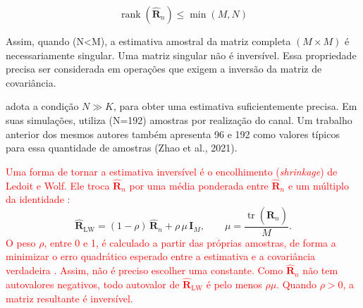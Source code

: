 \[
\operatorname{rank}(\widehat{\mathbf R}_n) \leq \min(M,N)
\]

Assim, quando (N<M), a estimativa amostral da matriz completa $(M\times M)$ é necessariamente singular. Uma matriz singular não é inversível. Essa propriedade precisa ser considerada em operações que exigem a inversão da matriz de covariância.

\cite{zhao2025jsac} adota a condição $N\gg K$, para obter uma estimativa suficientemente precisa. Em suas simulações, utiliza (N=192) amostras por realização do canal. Um trabalho anterior dos mesmos autores também apresenta 96 e 192 como valores típicos para essa quantidade de amostras (Zhao et al., 2021).

\textcolor{red}{Uma forma de tornar a estimativa inversível é o encolhimento (\textit{shrinkage}) de Ledoit e Wolf. Ele troca $\hat{\mathbf R}_n$ por uma média ponderada entre $\hat{\mathbf R}_n$ e um múltiplo da identidade \cite{ledoit-wolf}:}
\begin{equation}
\hat{\mathbf R}_{\text{LW}}=(1-\rho)\,\hat{\mathbf R}_n+\rho\,\mu\,\mathbf I_M,
\qquad
\mu=\frac{\operatorname{tr}(\hat{\mathbf R}_n)}{M}.
\label{eq:ledoit-wolf}
\end{equation}
\textcolor{red}{O peso $\rho$, entre 0 e 1, é calculado a partir das próprias amostras, de forma a minimizar o erro quadrático esperado entre a estimativa e a covariância verdadeira \cite{ledoit-wolf}. Assim, não é preciso escolher uma constante. Como $\hat{\mathbf R}_n$ não tem autovalores negativos, todo autovalor de $\hat{\mathbf R}_{\text{LW}}$ é pelo menos $\rho\mu$. Quando $\rho > 0$, a matriz resultante é inversível.}





